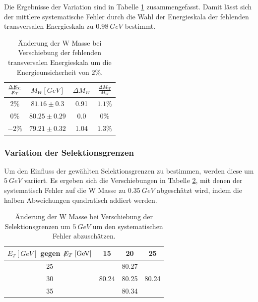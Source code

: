 \documentclass[a4paper,12pt]{article}
\newcommand{\met}{\ensuremath{\not\mathrel{E}}_T}
\begin{document}


Die Ergebnisse der Variation sind in Tabelle \ref{tab:sysmet} zusammengefasst. Damit lässt sich der mittlere systematische Fehler durch die
Wahl der Energieskala der fehlenden transversalen Energieskala zu $\SI{0.98}{GeV}$ bestimmt.
\begin{table}[h]
	\centering
	\begin{tabular}{c| c c c}
		$\frac{\Delta \met}{\met}$ & $M_{W} [\si{GeV}]$ & $\Delta M_{W}$ &$\frac{\Delta M_{W}}{M_{W}}$\\
		\hline
		$2\%$ & $81.16\pm 0.3$ & 0.91 & $1.1\%$\\
		$0\%$ & $80.25\pm 0.29$ & 0.0 & $0\%$ \\
		$-2\%$ & $79.21\pm 0.32$ & 1.04 &$1.3\%$
	\end{tabular}
	\caption{Änderung der W Masse bei Verschiebung der fehlenden transversalen Energieskala um die
	Energieunsicherheit von $2\%$.}
	\label{tab:sysmet}
\end{table}

\subsubsection*{Variation der Selektionsgrenzen}
Um den Einfluss der gewählten Selektionsgrenzen zu bestimmen, werden diese um $\SI{5}{GeV}$
variiert. Es ergeben sich die Verschiebungen in Tabelle \ref{tab:variation}, mit denen der systematisch Fehler
auf die W Masse zu $\SI{0.35}{GeV}$ abgeschätzt wird, indem die halben Abweichungen quadratisch addiert werden.
\begin{table}[h]
	\centering
	\begin{tabular}{c| c c c}
		$E_{T} [\si{GeV}]$ gegen $\met [\si{GeV}]$ & 15 & 20 & 25 \\
		\hline
		25 &  & 80.27 & \\
		30 & 80.24 & 80.25 & 80.24 \\
		35 &  & 80.34 &
	\end{tabular}
	\caption{Änderung der W Masse bei Verschiebung der Selektionsgrenzen um $\SI{5}{GeV}$ um den
systematischen Fehler abzuschätzen.}
	\label{tab:variation}
\end{table}
\end{document}
